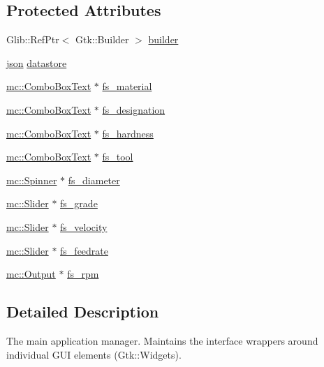 \subsection*{Protected Attributes}
\begin{DoxyCompactItemize}
\item 
Glib\+::\+Ref\+Ptr$<$ Gtk\+::\+Builder $>$ \hyperlink{classmcalc_1_1Application_ae877f6c9210ec88c743a54f750a54892}{builder}
\item 
\hyperlink{application_8hpp_ab701e3ac61a85b337ec5c1abaad6742d}{json} \hyperlink{classmcalc_1_1Application_a2fa9d06d424a8def5ea70fa07e844b9c}{datastore}
\item 
\hyperlink{classmc_1_1ComboBoxText}{mc\+::\+Combo\+Box\+Text} $\ast$ \hyperlink{classmcalc_1_1Application_a8c78f8ea0615db28858001aa5ed6b7b6}{fs\+\_\+material}
\item 
\hyperlink{classmc_1_1ComboBoxText}{mc\+::\+Combo\+Box\+Text} $\ast$ \hyperlink{classmcalc_1_1Application_a5dd81c68d005acedeb18336bfe87cdcb}{fs\+\_\+designation}
\item 
\hyperlink{classmc_1_1ComboBoxText}{mc\+::\+Combo\+Box\+Text} $\ast$ \hyperlink{classmcalc_1_1Application_acf53945a5bd5386c2d492e225878c45c}{fs\+\_\+hardness}
\item 
\hyperlink{classmc_1_1ComboBoxText}{mc\+::\+Combo\+Box\+Text} $\ast$ \hyperlink{classmcalc_1_1Application_a9775057e24515e6e3cf8c1c9a3144512}{fs\+\_\+tool}
\item 
\hyperlink{classmc_1_1Spinner}{mc\+::\+Spinner} $\ast$ \hyperlink{classmcalc_1_1Application_aa5fa7c6a44d89abb85a6947767261698}{fs\+\_\+diameter}
\item 
\hyperlink{classmc_1_1Slider}{mc\+::\+Slider} $\ast$ \hyperlink{classmcalc_1_1Application_aa92847f0410356a5515c461b269a840d}{fs\+\_\+grade}
\item 
\hyperlink{classmc_1_1Slider}{mc\+::\+Slider} $\ast$ \hyperlink{classmcalc_1_1Application_a6d4441380476fcbdafe23b28da5f6647}{fs\+\_\+velocity}
\item 
\hyperlink{classmc_1_1Slider}{mc\+::\+Slider} $\ast$ \hyperlink{classmcalc_1_1Application_a7cd486d0bde1d1ecdf82c41a5f2e6d53}{fs\+\_\+feedrate}
\item 
\hyperlink{classmc_1_1Output}{mc\+::\+Output} $\ast$ \hyperlink{classmcalc_1_1Application_a4b08a214c34fcb417f5cd14ca2e479c0}{fs\+\_\+rpm}
\end{DoxyCompactItemize}


\subsection{Detailed Description}
The main application manager. Maintains the interface wrappers around individual G\+UI elements (Gtk\+::\+Widgets). 

